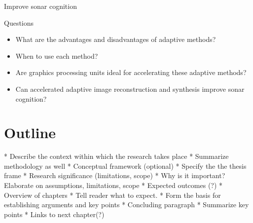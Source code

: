 Improve sonar cognition



Questions
\begin{itemize}
\item What are the advantages and disadvantages of adaptive methods?
\item When to use each method?
\item Are graphics processing units ideal for accelerating these adaptive methods?
\item Can accelerated adaptive image reconstruction and synthesis improve sonar cognition?
\end{itemize}

%
%
%


\section{Outline}
\ifIncludeWritingTips
\begin{markdown}
    * Describe the context within which the research takes place
    * Summarize methodology as well
* Conceptual framework (optional)
    * Specify the the thesis frame
* Research significance (limitations, scope)
    * Why is it important? Elaborate on assumptions, limitations, scope
* Expected outcomes (?)
* Overview of chapters
    * Tell reader what to expect.
    * Form the basis for establishing arguments and key points
* Concluding paragraph
    * Summarize key points
    * Links to next chapter(?)
\end{markdown}
\fi

